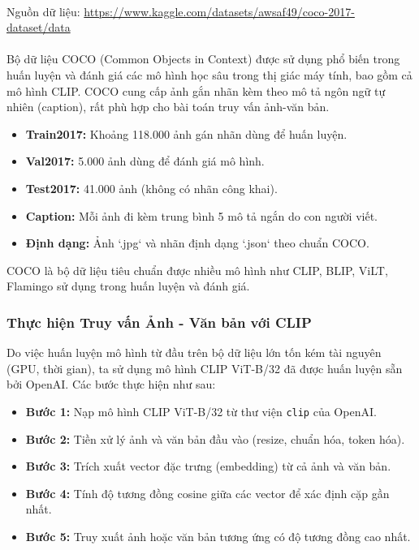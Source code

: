 \paragraph{} {Nguồn dữ liệu: \url{https://www.kaggle.com/datasets/awsaf49/coco-2017-dataset/data}

\paragraph{}{Bộ dữ liệu COCO (Common Objects in Context) được sử dụng phổ biến trong huấn luyện và đánh giá các mô hình học sâu trong thị giác máy tính, bao gồm cả mô hình CLIP. COCO cung cấp ảnh gắn nhãn kèm theo mô tả ngôn ngữ tự nhiên (caption), rất phù hợp cho bài toán truy vấn ảnh-văn bản.}

\begin{itemize}
    \item \textbf{Train2017:} Khoảng 118.000 ảnh gán nhãn dùng để huấn luyện.
    \item \textbf{Val2017:} 5.000 ảnh dùng để đánh giá mô hình.
    \item \textbf{Test2017:} 41.000 ảnh (không có nhãn công khai).
    \item \textbf{Caption:} Mỗi ảnh đi kèm trung bình 5 mô tả ngắn do con người viết.
    \item \textbf{Định dạng:} Ảnh `.jpg` và nhãn định dạng `.json` theo chuẩn COCO.
\end{itemize}

COCO là bộ dữ liệu tiêu chuẩn được nhiều mô hình như CLIP, BLIP, ViLT, Flamingo sử dụng trong huấn luyện và đánh giá.

\subsubsection{Thực hiện Truy vấn Ảnh - Văn bản với CLIP}

Do việc huấn luyện mô hình từ đầu trên bộ dữ liệu lớn tốn kém tài nguyên (GPU, thời gian), ta sử dụng mô hình CLIP ViT-B/32 đã được huấn luyện sẵn bởi OpenAI. Các bước thực hiện như sau:

\begin{itemize}
    \item \textbf{Bước 1:} Nạp mô hình CLIP ViT-B/32 từ thư viện \texttt{clip} của OpenAI.
    \item \textbf{Bước 2:} Tiền xử lý ảnh và văn bản đầu vào (resize, chuẩn hóa, token hóa).
    \item \textbf{Bước 3:} Trích xuất vector đặc trưng (embedding) từ cả ảnh và văn bản.
    \item \textbf{Bước 4:} Tính độ tương đồng cosine giữa các vector để xác định cặp gần nhất.
    \item \textbf{Bước 5:} Truy xuất ảnh hoặc văn bản tương ứng có độ tương đồng cao nhất.
\end{itemize}

}
